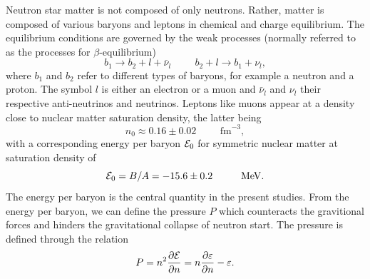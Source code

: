 Neutron star matter is not composed of only neutrons. Rather, matter is composed of various baryons and leptons in chemical and charge equilibrium.
The equilibrium conditions are governed by the weak
processes (normally referred to as the processes for
$\beta$-equilibrium)
\begin{equation} 
      b_1 \rightarrow b_2 + l +\bar{\nu}_l \hspace{1cm} b_2 +l \rightarrow b_1 
+\nu_l,
      \label{eq:betadecay}
\end{equation}
where $b_1$ and $b_2$ refer to  different types of baryons, for example a neutron and a proton.  
The symbol $l$ is either an electron or a muon and  $\bar{\nu}_l $
and $\nu_l$ their respective anti-neutrinos and neutrinos. Leptons like muons 
appear at
a density close to nuclear matter saturation density, the latter being
\[
     n_0 \approx 0.16 \pm 0.02 \hspace{1cm} \mathrm{fm}^{-3},
\]
with a corresponding energy per baryon ${\cal E}_0$ 
for symmetric nuclear matter at saturation density of
\[
     {\cal E}_0 = B/A=-15.6\pm 0.2 \hspace{1cm} \mathrm{MeV}.
\]
The energy per baryon is the central quantity in the present studies. From the energy per baryon, we can define the pressure 
$P$ which counteracts the gravitional forces and hinders the gravitational collapse of neutron start. The pressure  is defined through the relation
\begin{equation}
    P=n^2\frac{\partial {\cal E}}{\partial n}=
      n\frac{\partial \varepsilon}{\partial n}-\varepsilon.
\end{equation}

